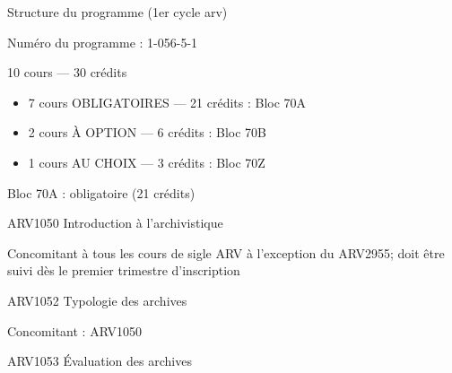 \documentclass [12 pt]{article}
\begin{document}
        Structure du programme (1er cycle arv)
        
            Numéro du programme : 1-056-5-1
            
                
                    10 cours — 30 crédits
                
            
            
        \begin{itemize}
        
                
        \item 7 cours OBLIGATOIRES — 21 crédits : Bloc 70A
                
        \item 2 cours À OPTION — 6 crédits : Bloc 70B
                
        \item 1 cours AU CHOIX — 3 crédits : Bloc 70Z
            
        \end{itemize}
    
            
                
                    
                        
                            
                                Bloc 70A : obligatoire (21 crédits)
                            
                        
                        
                            
                                ARV1050 Introduction à l'archivistique
                            
                            
                                Concomitant à tous les cours de sigle ARV à
                                        l'exception du ARV2955; doit être suivi dès
                                        le premier trimestre d'inscription
                            
                        
                        
                            
                                ARV1052 Typologie des archives
                            
                            
                                Concomitant : ARV1050
                            
                        
                        
                            
                                ARV1053 Évaluation des archives
                            
\end{document}
